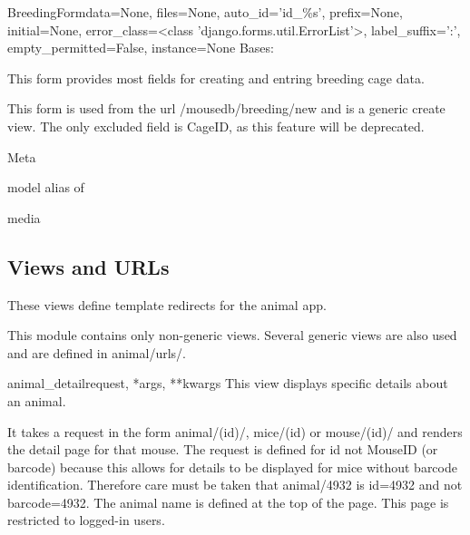 \documentclass[letterpaper,10pt,english]{sphinxmanual}
\begin{document}
\hypertarget{animal.forms.BreedingForm}{}\begin{classdesc}{BreedingForm}{data=None, files=None, auto\_id='id\_\%s', prefix=None, initial=None, error\_class=\textless{}class 'django.forms.util.ErrorList'\textgreater{}, label\_suffix=':', empty\_permitted=False, instance=None}
Bases: 

This form provides most fields for creating and entring breeding cage data.

This form is used from the url /mousedb/breeding/new and is a generic create view.  The only excluded field is CageID, as this feature will be deprecated.

\hypertarget{animal.forms.BreedingForm.Meta}{}\begin{classdesc}{Meta}{}~

\hypertarget{animal.forms.BreedingForm.Meta.model}{}\begin{memberdesc}{model}
alias of 
\end{memberdesc}
\end{classdesc}

\hypertarget{animal.forms.BreedingForm.media}{}\begin{memberdesc}[BreedingForm]{media}\end{memberdesc}
\end{classdesc}


\subsection{Views and URLs}
\hypertarget{module-animal.views}{}
\modulesynopsis{}
These views define template redirects for the animal app.

This module contains only non-generic views.  Several generic views are also used and are defined in animal/urls/.

\hypertarget{animal.views.animal\_detail}{}\begin{funcdesc}{animal\_detail}{request, *args, **kwargs}
This view displays specific details about an animal.

It takes a request in the form animal/(id)/, mice/(id) or mouse/(id)/ and renders the detail page for that mouse.  The request is defined for id not MouseID (or barcode) because this allows for details to be displayed for mice without barcode identification.
Therefore care must be taken that animal/4932 is id=4932 and not barcode=4932.  The animal name is defined at the top of the page.
This page is restricted to logged-in users.
\end{funcdesc}
\end{document}
